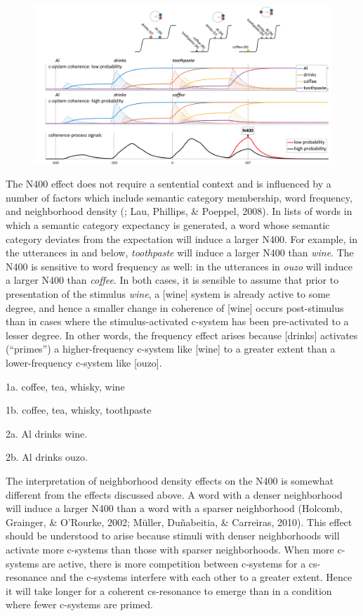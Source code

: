   
\begin{figure}
\includegraphics[width=\textwidth]{figures/Tilsen-img143.png}
\caption{\missingcaption}
\label{fig:}
\end{figure}
 

The N400 effect does not require a sentential context and is influenced by a number of factors which include semantic category membership, word frequency, and neighborhood density (\citealt{KutasFedermeier2011}; Lau, Phillips, \& Poeppel, 2008). In lists of words in which a semantic category expectancy is generated, a word whose semantic category deviates from the expectation will induce a larger N400. For example, in the utterances in  and  below, \textit{toothpaste} will induce a larger N400 than \textit{wine}. The N400 is sensitive to word frequency as well: in the utterances in  \textit{ouzo} will induce a larger N400 than \textit{coffee}. In both cases, it is sensible to assume that prior to presentation of the stimulus \textit{wine}, a [wine] system is already active to some degree, and hence a smaller change in coherence of [wine] occurs post-stimulus than in cases where the stimulus-activated c-system has been pre-activated to a lesser degree. In other words, the frequency effect arises because [drinks] activates (“primes”) a higher-frequency c-system like [wine] to a greater extent than a lower-frequency c-system like [ouzo].

  1a. coffee, tea, whisky, wine

  1b. coffee, tea, whisky, toothpaste

  2a. Al drinks wine.

  2b. Al drinks ouzo.

  The interpretation of neighborhood density effects on the N400 is somewhat different from the effects discussed above. A word with a denser neighborhood will induce a larger N400 than a word with a sparser neighborhood (Holcomb, Grainger, \& O’Rourke, 2002; Müller, Duñabeitia, \& Carreiras, 2010). This effect should be understood to arise because stimuli with denser neighborhoods will activate more c-systems than those with sparser neighborhoods. When more c-systems are active, there is more competition between c-systems for a cs-resonance and the c-systems interfere with each other to a greater extent. Hence it will take longer for a coherent cs-resonance to emerge than in a condition where fewer c-systems are primed. 


